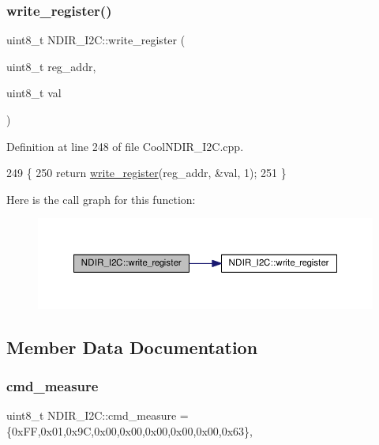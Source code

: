 \subsubsection{\texorpdfstring{write\+\_\+register()}{write\_register()}\hspace{0.1cm}{\footnotesize\ttfamily [2/2]}}
{\footnotesize\ttfamily uint8\+\_\+t N\+D\+I\+R\+\_\+\+I2\+C\+::write\+\_\+register (\begin{DoxyParamCaption}\item[{uint8\+\_\+t}]{reg\+\_\+addr,  }\item[{uint8\+\_\+t}]{val }\end{DoxyParamCaption})\hspace{0.3cm}{\ttfamily [private]}}



Definition at line 248 of file Cool\+N\+D\+I\+R\+\_\+\+I2\+C.\+cpp.


\begin{DoxyCode}
249 \{
250     \textcolor{keywordflow}{return} \hyperlink{class_n_d_i_r___i2_c_a5de6a044b00e985f035edca07521e319}{write\_register}(reg\_addr, &val, 1);
251 \}
\end{DoxyCode}
Here is the call graph for this function\+:\nopagebreak
\begin{figure}[H]
\begin{center}
\leavevmode
\includegraphics[width=350pt]{d6/ddb/class_n_d_i_r___i2_c_a8ad2a76f9866b0a1f34810a147b4b20d_cgraph}
\end{center}
\end{figure}


\subsection{Member Data Documentation}
\mbox{\label{class_n_d_i_r___i2_c_af47e04052a5fb25c79e7142b673aae28}} 
\subsubsection{\texorpdfstring{cmd\+\_\+measure}{cmd\_measure}}
{\footnotesize\ttfamily uint8\+\_\+t N\+D\+I\+R\+\_\+\+I2\+C\+::cmd\+\_\+measure = \{0x\+F\+F,0x01,0x9\+C,0x00,0x00,0x00,0x00,0x00,0x63\}\hspace{0.3cm}{\ttfamily [static]}, {\ttfamily [private]}}



